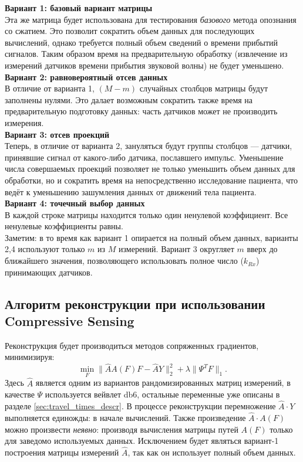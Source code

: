 \documentclass[14pt]{matmex-diploma}
\begin{document}
\textbf{Вариант 1: базовый вариант матрицы}\\

Эта же матрица будет использована для тестирования \textit{базового} метода опознания со сжатием. Это позволит сократить объем данных для последующих вычислений, однако требуется полный объем сведений о времени прибытий сигналов. Таким образом время на предварительную обработку (извлечение из измерений датчиков времени прибытия звуковой волны) не будет уменьшено.\\

\textbf{Вариант 2: равновероятный отсев данных}\\

В отличие от варианта 1, $(M-m)$ случайных столбцов матрицы будут заполнены нулями. Это далает возможным сократить также время на предварительную подготовку данных: часть датчиков может не производить измерения.\\

\textbf{Вариант 3: отсев проекций}\\

Теперь, в отличие от варианта 2, зануляться будут группы столбцов --- датчики, принявшие сигнал от какого-либо датчика, пославшего импульс. Уменьшение числа совершаемых проекций позволяет не только уменьшить объем данных для обработки, но и сократить время на непосредственно исследование пациента, что ведёт к уменьшению зашумления данных от движений тела пациента. \\

\textbf{Вариант 4: точечный выбор данных}\\

В каждой строке матрицы находится только один ненулевой коэффициент. Все ненулевые коэффициенты равны. \\

Заметим: в то время как вариант 1 опирается на полный объем данных, варианты 2,4 используют только $m \text{ из } M$ измерений. Вариант 3 округляет $m$ вверх до ближайшего значения, позволяющего использовать полное число ($k_{Rx}$) принимающих датчиков.

\subsection{Алгоритм реконструкции при использовании Com\-pres\-sive Sensing}
Реконструкция будет производиться методов сопряженных градиентов, минимизируя:
\begin{equation}
\label{eq:conj_cs}
\min_F \| \hat{A} A(F) F - \hat{A}Y \|_2^2 + \lambda \| \Psi^T F \|_1.
\end{equation}
Здесь $\hat{A}$ является одним из вариантов рандомизированных матриц измерений, в качестве $\Psi$ используется вейвлет db6, остальные переменные уже описаны в разделе \ref{sec:travel_times_descr}. 
В процессе реконструкции перемножение $\hat{A}\cdot Y$ выполняется единожды: в начале вычислений. Также произведение $\hat{A} \cdot A(F)$ можно произвести \textit{неявно}: производя вычисления матрицы путей $A(F)$ только для заведомо используемых данных. Исключением будет являться вариант-1 построения матрицы измерений $\hat{A}$, так как он использует полный объем данных.
\end{document}
